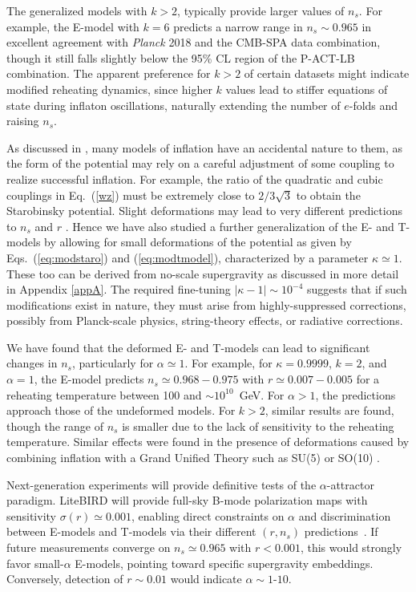 \documentclass[aps,prev,twocolumn,preprintnumbers,floatfix,nofootinbib]{revtex4-1}
\begin{document}
The generalized models with $k > 2$, 
typically provide larger values of $n_s$. For example, the E-model with $k=6$ predicts a narrow 
range in $n_s \sim 0.965$ in excellent agreement with {\it Planck} 2018 and the CMB-SPA data combination, though it still falls slightly below the 95\% CL region of the P-ACT-LB combination. 
The apparent preference for $k >2$ of certain datasets might indicate modified reheating dynamics, since higher $k$ values lead to stiffer equations of state during inflaton oscillations, naturally extending the number of $e$-folds and raising $n_s$. 
  
As discussed in \cite{accident,accid}, many models of inflation have an accidental nature to them, as the form of the potential may rely on a careful adjustment of some coupling to realize successful inflation. For example, the ratio of the quadratic and cubic couplings in Eq.~(\ref{wz}) must be extremely close to $2/3\sqrt{3}$ to obtain the Starobinsky potential. Slight deformations may lead to very different predictions to $n_s$ and $r$ \cite{ENO6}. Hence we have also studied a further generalization of the E- and T-models by allowing for small deformations of the potential as given by Eqs.~(\ref{eq:modstaro}) and (\ref{eq:modtmodel}),  characterized by a parameter $\kappa \simeq 1$. These too can be derived from no-scale supergravity as discussed in more detail in Appendix \ref{appA}. 
The required fine-tuning $|\kappa - 1| \sim 10^{-4}$ suggests that if such modifications exist in nature, they must arise from highly-suppressed corrections, possibly from Planck-scale physics, string-theory effects, or radiative corrections.

We have found that the deformed E- and T-models can lead to significant changes in $n_s$, particularly for $\alpha \simeq 1$. For example, 
for $\kappa = 0.9999$, $k=2$, and $\alpha = 1$, the E-model predicts $n_s \simeq 0.968-0.975$ with $r \simeq 0.007 - 0.005$ for a reheating temperature between 100 and $\sim 10^{10}$~GeV. For $\alpha > 1$, the predictions approach those of the undeformed models. For $k > 2$, similar results are found, though the range of $n_s$ is smaller due to the lack of sensitivity to the reheating temperature. Similar effects were found in the presence of deformations caused by combining inflation with a Grand Unified Theory such as SU(5) or SO(10) \cite{deform}.



Next-generation experiments will provide definitive tests of the $\alpha$-attractor paradigm. LiteBIRD will provide full-sky B-mode polarization maps with sensitivity $\sigma(r) \simeq 0.001$, enabling direct constraints on $\alpha$ and discrimination between E-models and T-models via their different $(r, n_s)$ predictions~\cite{Hazumi:2019lys}. If future measurements converge on $n_s \simeq 0.965$ with $r < 0.001$, this would strongly favor small-$\alpha$ E-models, pointing toward specific supergravity embeddings. Conversely, detection of $r \sim 0.01$ would indicate $\alpha \sim 1$-$10$.
\end{document}
